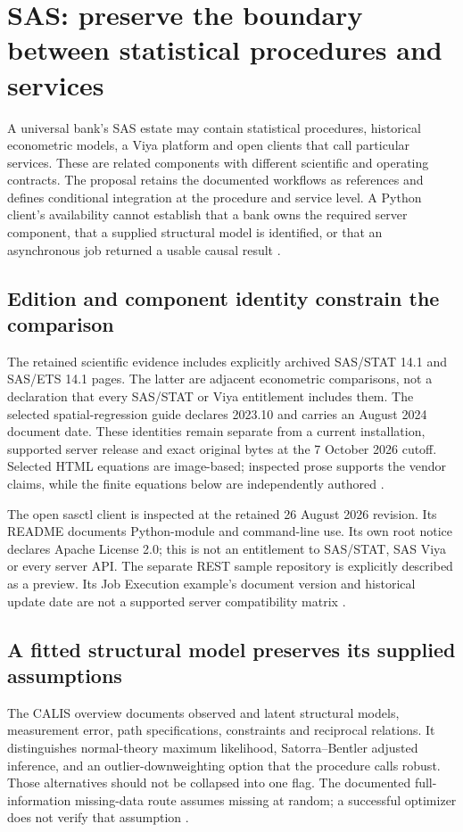 \section{SAS: preserve the boundary between statistical procedures and services}
\label{sec:exec24-sas-reuse}

A universal bank's SAS estate may contain statistical procedures, historical
econometric models, a Viya platform and open clients that call particular
services. These are related components with different scientific and operating
contracts. The proposal retains the documented workflows as references and
defines conditional integration at the procedure and service level. A Python
client's availability cannot establish that a bank owns the required server
component, that a supplied structural model is identified, or that an
asynchronous job returned a usable causal result
\citep{exec13_latent_sas_calis,exec23_workflow_sasctl,
exec23_workflow_delegates_sasctl,exec24_sas_choice}.

\subsection{Edition and component identity constrain the comparison}
The retained scientific evidence includes explicitly archived SAS/STAT 14.1
and SAS/ETS 14.1 pages. The latter are adjacent econometric comparisons,
not a declaration that every SAS/STAT or Viya entitlement includes them.
The selected spatial-regression guide declares 2023.10 and carries an
August 2024 document date. These identities remain separate from a current
installation, supported server release and exact original bytes at the
7 October 2026 cutoff. Selected HTML equations are image-based; inspected
prose supports the vendor claims, while the finite equations below are
independently authored
\citep{exec13_ct_sas_causal,exec13_ivrd_sas,
exec20_network_sas_latest_spatial,exec24_sas_choice}.

The open sasctl client is inspected at the retained 26 August 2026 revision.
Its README documents Python-module and command-line use. Its own root notice
declares Apache License 2.0; this is not an entitlement to SAS/STAT, SAS Viya
or every server API. The separate REST sample repository is explicitly
described as a preview. Its Job Execution example's document version and
historical update date are not a supported server compatibility matrix
\citep{exec23_workflow_sasctl,exec24_workflow_contracts_sas}.

\subsection{A fitted structural model preserves its supplied assumptions}
The CALIS overview documents observed and latent structural models,
measurement error, path specifications, constraints and reciprocal relations.
It distinguishes normal-theory maximum likelihood, Satorra--Bentler adjusted
inference, and an outlier-downweighting option that the procedure calls
robust. Those alternatives should not be collapsed into one flag. The
documented full-information missing-data route assumes missing at random;
a successful optimizer does not verify that assumption
\citep{exec13_latent_sas_calis}.


